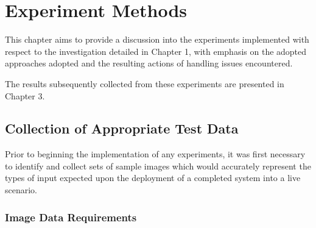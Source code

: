 \chapter{Experiment Methods}
%
%
%
%

This chapter aims to provide a discussion into the experiments implemented with respect to the investigation detailed in Chapter 1, with emphasis on the adopted approaches adopted and the resulting actions of handling issues encountered.

The results subsequently collected from these experiments are presented in Chapter 3.

\section{Collection of Appropriate Test Data}

Prior to beginning the implementation of any experiments, it was first necessary to identify and collect sets of sample images which would accurately represent the types of input expected upon the deployment of a completed system into a live scenario. 

\subsection{Image Data Requirements}

